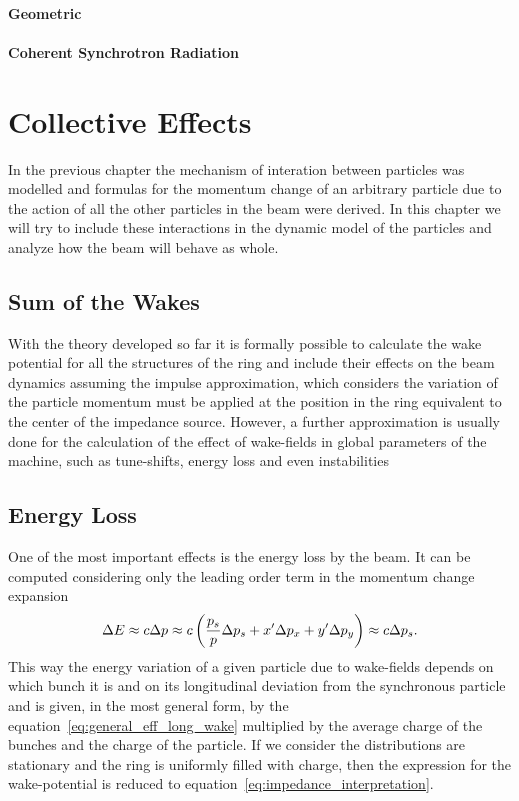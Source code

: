 \subsubsection{Geometric}
\subsubsection{Coherent Synchrotron Radiation}


\chapter{Collective Effects}\label{cap:collective_effects}

    In the previous chapter the mechanism of interation between particles was modelled and formulas for the momentum change of an arbitrary particle due to the action of all the other particles in the beam were derived. In this chapter we will try to include these interactions in the dynamic model of the particles and analyze how the beam will behave as whole.

\section{Sum of the Wakes}

    With the theory developed so far it is formally possible to calculate the wake potential for all the structures of the ring and include their effects on the beam dynamics assuming the impulse approximation, which considers the variation of the particle momentum must be applied at the position in the ring equivalent to the center of the impedance source. However, a further approximation is usually done for the calculation of the effect of wake-fields in global parameters of the machine, such as tune-shifts, energy loss and even instabilities



\section{Energy Loss}

    One of the most important effects is the energy loss by the beam. It can be computed considering only the leading order term in the momentum change expansion
    \begin{align}
        \Delta E \approx c\Delta p \approx c\left(\frac{p_s}{p}\Delta p_s + x'\Delta p_x + y'\Delta p_y\right) \approx c\Delta p_s.
    \end{align}
    This way the energy variation of a given particle due to wake-fields depends on which bunch it is and on its longitudinal deviation from the synchronous particle and is given, in the most general form, by the  equation~\eqref{eq:general_eff_long_wake} multiplied by the average charge of the bunches and the charge of the particle. If we consider the distributions are stationary and the ring is uniformly filled with charge, then the expression for the wake-potential is reduced to equation~\eqref{eq:impedance_interpretation}.

